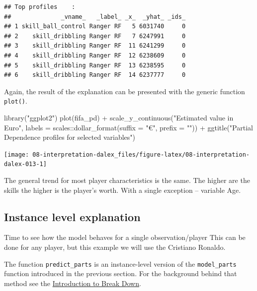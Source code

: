 \documentclass[
]{scrbook}
\newenvironment{Shaded}{\begin{snugshade}}{\end{snugshade}}
\newcommand{\AttributeTok}[1]{\textcolor[rgb]{0.77,0.63,0.00}{#1}}
\newcommand{\FunctionTok}[1]{\textcolor[rgb]{0.00,0.00,0.00}{#1}}
\newcommand{\NormalTok}[1]{#1}
\newcommand{\SpecialCharTok}[1]{\textcolor[rgb]{0.00,0.00,0.00}{#1}}
\newcommand{\StringTok}[1]{\textcolor[rgb]{0.31,0.60,0.02}{#1}}
\renewenvironment{Shaded} {\begin{snugshade}\small} {\end{snugshade}}
\begin{document}
\begin{verbatim}
## Top profiles    : 
##              _vname_   _label_ _x_  _yhat_ _ids_
## 1 skill_ball_control Ranger RF   5 6031740     0
## 2    skill_dribbling Ranger RF   7 6247991     0
## 3    skill_dribbling Ranger RF  11 6241299     0
## 4    skill_dribbling Ranger RF  12 6238609     0
## 5    skill_dribbling Ranger RF  13 6238595     0
## 6    skill_dribbling Ranger RF  14 6237777     0
\end{verbatim}

Again, the result of the explanation can be presented with the generic function \texttt{plot()}.

\begin{Shaded}
\begin{Highlighting}[]
\FunctionTok{library}\NormalTok{(}\StringTok{"ggplot2"}\NormalTok{)}
\FunctionTok{plot}\NormalTok{(fifa\_pd) }\SpecialCharTok{+}
  \FunctionTok{scale\_y\_continuous}\NormalTok{(}\StringTok{"Estimated value in Euro"}\NormalTok{, }\AttributeTok{labels =}\NormalTok{ scales}\SpecialCharTok{::}\FunctionTok{dollar\_format}\NormalTok{(}\AttributeTok{suffix =} \StringTok{"€"}\NormalTok{, }\AttributeTok{prefix =} \StringTok{""}\NormalTok{)) }\SpecialCharTok{+}
  \FunctionTok{ggtitle}\NormalTok{(}\StringTok{"Partial Dependence profiles for selected variables"}\NormalTok{)}
\end{Highlighting}
\end{Shaded}

\begin{center}\texttt{[image: 08-interpretation-dalex\_files/figure-latex/08-interpretation-dalex-013-1]} \end{center}

The general trend for most player characteristics is the same. The higher are the skills the higher is the player's worth. With a single exception -- variable Age.

\hypertarget{interpretability-instance-level}{%
\subsection{Instance level explanation}\label{interpretability-instance-level}}

Time to see how the model behaves for a single observation/player
This can be done for any player, but this example we will use the Cristiano Ronaldo.

The function \texttt{predict\_parts} is an instance-level version of the \texttt{model\_parts} function introduced in the previous section. For the background behind that method see the \href{https://pbiecek.github.io/ema/breakDown.html}{Introduction to Break Down}.
\end{document}
